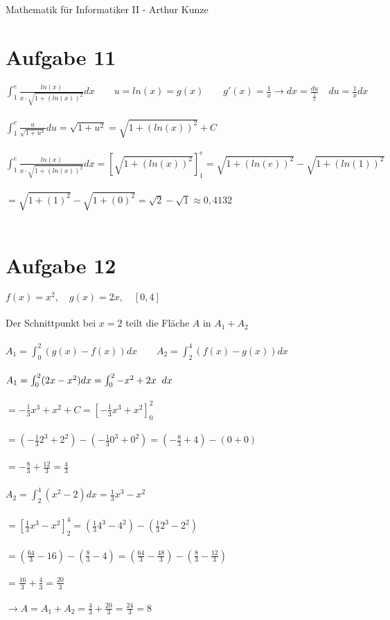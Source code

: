 \documentclass[12pt,a4paper]{article}
\begin{document}
Mathematik für Informatiker II - Arthur Kunze
\section*{Aufgabe 11}
$\int_{1}^{e}\frac{ln(x)}{x\cdot \sqrt{1+(ln(x))^2}}dx \qquad  u=ln(x)=g(x) \qquad g'(x)=\frac{1}{x} \rightarrow dx=\frac{du}{\frac{1}{x}} \quad du=\frac{1}{x}dx$\\
\\
$\int_{1}^{e}\frac{u}{\sqrt{1+u^2}}du = \sqrt{1+u^2} = \sqrt{1+(ln(x))^2}+C$\\
\\
$\int_{1}^{e}\frac{ln(x)}{x\cdot \sqrt{1+(ln(x))^2}}dx = \left[\sqrt{1+(ln(x))^2}\right]_1^e = \sqrt{1+(ln(e))^2}-\sqrt{1+(ln(1))^2}$\\
\\
$=\sqrt{1+(1)^2}-\sqrt{1+(0)^2}=\sqrt{2}-\sqrt{1} \approx 0,4132$\\
\\
\section*{Aufgabe 12}
$f(x)=x^2, \quad g(x)=2x, \quad [0,4]$\\
\\
Der Schnittpunkt bei $x=2$ teilt die Fläche $A$ in $A_1+A_2$\\
\\
$A_1=\int_0^2(g(x)-f(x))dx \qquad A_2=\int_2^4(f(x)-g(x))dx$\\
\\
$A_1=\int_0^2(2x-x^2)dx=\int_0^2-x^2+2x \hspace{0.2cm} dx$\\
\\
$=-\frac{1}{3}x^3+x^2+C = \left[-\frac{1}{3}x^3+x^2\right]_0^2$\\
\\
$=(-\frac{1}{3}2^3+2^2)-(-\frac{1}{3}0^3+0^2)=(-\frac{8}{3}+4)-(0+0)$\\
\\
$=-\frac{8}{3}+\frac{12}{3}=\frac{4}{3}$\\
\\
$A_2=\int_2^4(x^2-2)dx = \frac{1}{3}x^3-x^2$\\
\\
$=\left[\frac{1}{3}x^3-x^2\right]_2^4=(\frac{1}{3}4^3-4^2)-(\frac{1}{3}2^3-2^2)$\\
\\
$=(\frac{64}{3}-16)-(\frac{8}{3}-4)=(\frac{64}{3}-\frac{48}{3})-(\frac{8}{3}-\frac{12}{3})$\\
\\
$=\frac{16}{3}+\frac{4}{3}=\frac{20}{3}$\\
\\
$\rightarrow A=A_1+A_2=\frac{4}{3}+\frac{20}{3}=\frac{24}{3}=8$\\
\\
\end{document}

